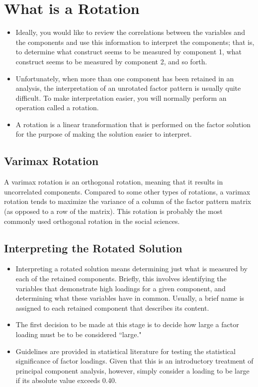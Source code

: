 \documentclass[a4paper,12pt]{article}
\begin{document}
	

\section*{What is a Rotation}
\begin{itemize}
	\item Ideally, you would like to review the correlations between the variables and the
	components and use this information to interpret the components; that is, to determine what
	construct seems to be measured by component 1, what construct seems to be measured by
	component 2, and so forth. 
	\item Unfortunately, when more than one component has been retained in
	an analysis, the interpretation of an unrotated factor pattern is usually quite difficult. To make
	interpretation easier, you will normally perform an operation called a rotation. 
	\item A rotation is a
	linear transformation that is performed on the factor solution for the purpose of making the
	solution easier to interpret.
\end{itemize}


\subsection{Varimax Rotation}
A varimax rotation is an orthogonal rotation, meaning that
it results in uncorrelated components. Compared to some other types of rotations, a varimax
rotation tends to maximize the variance of a column of the factor pattern matrix (as opposed to a
row of the matrix). This rotation is probably the most commonly used orthogonal rotation in the
social sciences.

\subsection{Interpreting the Rotated Solution}
\begin{itemize}
\item Interpreting a rotated solution means determining just what is measured by each of the retained
components. Briefly, this involves identifying the variables that demonstrate high loadings for a
given component, and determining what these variables have in common. Usually, a brief name
is assigned to each retained component that describes its content.
\item The first decision to be made at this stage is to decide how large a factor loading must be to be
considered ``large."
\item 
Guidelines are provided in statistical literature for testing the statistical significance of factor loadings. Given that this is an introductory treatment of principal component analysis, however, simply consider a loading
to be large if its absolute value exceeds 0.40.
\end{itemize}
\newpage
\end{document}
